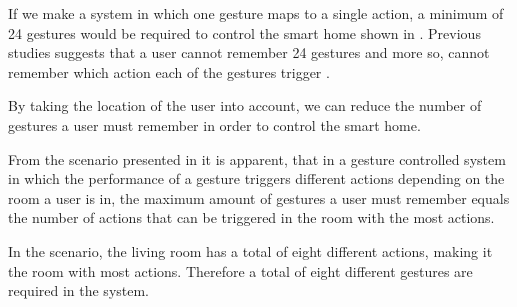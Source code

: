If we make a system in which one gesture maps to a single action, a minimum of 24 gestures would be required to control the smart home shown in . Previous studies suggests that a user cannot remember 24 gestures and more so, cannot remember which action each of the gestures trigger \cite{Kela2006,miller1956magical}.

By taking the location of the user into account, we can reduce the number of gestures a user must remember in order to control the smart home.

From the scenario presented in  it is apparent, that in a gesture controlled system in which the performance of a gesture triggers different actions depending on the room a user is in, the maximum amount of gestures a user must remember equals the number of actions that can be triggered in the room with the most actions.

In the scenario, the living room has a total of eight different actions, making it the room with most actions. Therefore a total of eight different gestures are required in the system.

